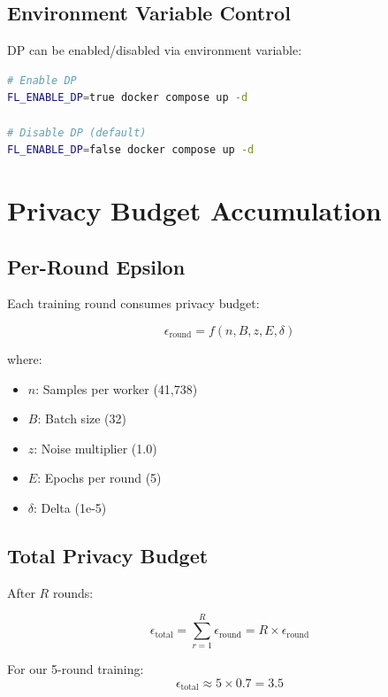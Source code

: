 \documentclass[12pt,a4paper]{article}
\begin{document}
\subsection{Environment Variable Control}

DP can be enabled/disabled via environment variable:

\begin{lstlisting}[language=bash, basicstyle=\small]
# Enable DP
FL_ENABLE_DP=true docker compose up -d

# Disable DP (default)
FL_ENABLE_DP=false docker compose up -d
\end{lstlisting}

\section{Privacy Budget Accumulation}

\subsection{Per-Round Epsilon}

Each training round consumes privacy budget:

\begin{equation}
\epsilon_{\text{round}} = f(n, B, z, E, \delta)
\end{equation}

where:
\begin{itemize}
    \item $n$: Samples per worker (41,738)
    \item $B$: Batch size (32)
    \item $z$: Noise multiplier (1.0)
    \item $E$: Epochs per round (5)
    \item $\delta$: Delta (1e-5)
\end{itemize}

\subsection{Total Privacy Budget}

After $R$ rounds:

\begin{equation}
\epsilon_{\text{total}} = \sum_{r=1}^{R} \epsilon_{\text{round}} = R \times \epsilon_{\text{round}}
\end{equation}

For our 5-round training:
\begin{equation}
\epsilon_{\text{total}} \approx 5 \times 0.7 = 3.5
\end{equation}
\end{document}
